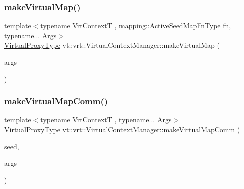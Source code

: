 \subsubsection{\texorpdfstring{make\+Virtual\+Map()}{makeVirtualMap()}\hspace{0.1cm}{\footnotesize\ttfamily [2/2]}}
{\footnotesize\ttfamily template$<$typename Vrt\+ContextT , mapping\+::\+Active\+Seed\+Map\+Fn\+Type fn, typename... Args$>$ \\
\hyperlink{namespacevt_a1b417dd5d684f045bb58a0ede70045ac}{Virtual\+Proxy\+Type} vt\+::vrt\+::\+Virtual\+Context\+Manager\+::make\+Virtual\+Map (\begin{DoxyParamCaption}\item[{Args...}]{args }\end{DoxyParamCaption})}

\mbox{\label{structvt_1_1vrt_1_1_virtual_context_manager_a37eee2956b5b17cae7e4fd6e51869cc0}} 
\subsubsection{\texorpdfstring{make\+Virtual\+Map\+Comm()}{makeVirtualMapComm()}}
{\footnotesize\ttfamily template$<$typename Vrt\+ContextT , typename... Args$>$ \\
\hyperlink{namespacevt_a1b417dd5d684f045bb58a0ede70045ac}{Virtual\+Proxy\+Type} vt\+::vrt\+::\+Virtual\+Context\+Manager\+::make\+Virtual\+Map\+Comm (\begin{DoxyParamCaption}\item[{\hyperlink{namespacevt_ae2e13198bdef4d5b8e603d6c1c7f0969}{Seed\+Type} const \&}]{seed,  }\item[{Args \&\&...}]{args }\end{DoxyParamCaption})\hspace{0.3cm}{\ttfamily [private]}}

\mbox{\label{structvt_1_1vrt_1_1_virtual_context_manager_a18c6dad4c4c963f883c59f64f78e36cb}} 

